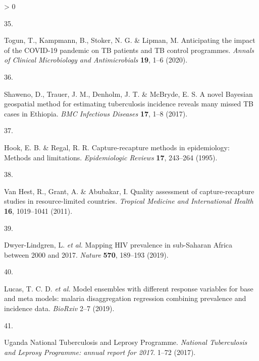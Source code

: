 \documentclass[
]{article}
\newlength{\cslhangindent}
\newlength{\csllabelwidth}
\newenvironment{CSLReferences}[2] %
 {%
  \setlength{\parindent}{0pt}
  \ifodd #1 \everypar{\setlength{\hangindent}{\cslhangindent}}\ignorespaces\fi
  \ifnum #2 > 0
  \setlength{\parskip}{#2\baselineskip}
  \fi
 }%
 {}
\newcommand{\CSLLeftMargin}[1]{\parbox[t]{\csllabelwidth}{#1}}
\newcommand{\CSLRightInline}[1]{\parbox[t]{\linewidth - \csllabelwidth}{#1}\break}
\begin{document}
\begin{CSLReferences}{0}{0}
\leavevmode\hypertarget{ref-Togun2020}{}%
\CSLLeftMargin{35. }
\CSLRightInline{Togun, T., Kampmann, B., Stoker, N. G. \& Lipman, M. {Anticipating the impact of the COVID-19 pandemic on TB patients and TB control programmes}. \emph{Annals of Clinical Microbiology and Antimicrobials} \textbf{19}, 1--6 (2020).}

\leavevmode\hypertarget{ref-Shaweno2017}{}%
\CSLLeftMargin{36. }
\CSLRightInline{Shaweno, D., Trauer, J. M., Denholm, J. T. \& McBryde, E. S. {A novel Bayesian geospatial method for estimating tuberculosis incidence reveals many missed TB cases in Ethiopia}. \emph{BMC Infectious Diseases} \textbf{17}, 1--8 (2017).}

\leavevmode\hypertarget{ref-Hook1995}{}%
\CSLLeftMargin{37. }
\CSLRightInline{Hook, E. B. \& Regal, R. R. {Capture-recapture methods in epidemiology: Methods and limitations}. \emph{Epidemiologic Reviews} \textbf{17}, 243--264 (1995).}

\leavevmode\hypertarget{ref-VanHest2011}{}%
\CSLLeftMargin{38. }
\CSLRightInline{Van Hest, R., Grant, A. \& Abubakar, I. {Quality assessment of capture-recapture studies in resource-limited countries}. \emph{Tropical Medicine and International Health} \textbf{16}, 1019--1041 (2011).}

\leavevmode\hypertarget{ref-Dwyer-Lindgren2019}{}%
\CSLLeftMargin{39. }
\CSLRightInline{Dwyer-Lindgren, L. \emph{et al.} {Mapping HIV prevalence in sub-Saharan Africa between 2000 and 2017}. \emph{Nature} \textbf{570}, 189--193 (2019).}

\leavevmode\hypertarget{ref-Lucas2019}{}%
\CSLLeftMargin{40. }
\CSLRightInline{Lucas, T. C. D. \emph{et al.} {Model ensembles with different response variables for base and meta models: malaria disaggregation regression combining prevalence and incidence data}. \emph{BioRxiv} 2--7 (2019).}

\leavevmode\hypertarget{ref-UgandaNationalTuberculosisandLeprosyProgramme2017b}{}%
\CSLLeftMargin{41. }
\CSLRightInline{Uganda National Tuberculosis and Leprosy Programme. \emph{{National Tuberculosis and Leprosy Programme: annual report for 2017}}. 1--72 (2017).}

\end{CSLReferences}

\newpage
\end{document}
